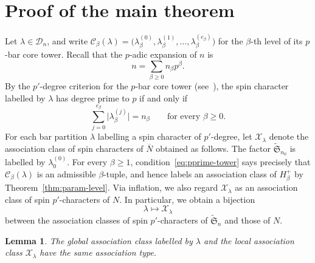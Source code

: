 \documentclass[reqno]{amsart}
\newcommand{\sym}{\mathfrak{S}}
\newtheorem{lemma}[theorem]{Lemma}     %
\theoremstyle{definition}
\begin{document}
\section{Proof of the main theorem}
\label{sec:main-proof}

Let $\lambda\in\mathcal D_n$, and write
$
\mathcal C_\beta(\lambda)
=
\bigl(
\lambda_\beta^{(0)},\lambda_\beta^{(1)},\ldots,
\lambda_\beta^{(e_\beta)}
\bigr)
$ 
for the $\beta$-th level of its $p$-bar core tower. Recall that
the $p$-adic expansion of $n$ is
\[
n=\sum_{\beta\geq0}n_\beta p^\beta.
\]
By the $p'$-degree criterion for the $p$-bar core tower
(see~\cite[Proposition~7.3]{olsson}), the spin character labelled by
$\lambda$ has degree prime to $p$ if and only if
\begin{equation}
\label{eq:pprime-tower}
\sum_{j=0}^{e_\beta}
\bigl|\lambda_\beta^{(j)}\bigr|
=
n_\beta
\qquad
\text{for every }\beta\geq0.
\end{equation}
For each bar partition $\lambda$ labelling a spin character of
$p'$-degree, let $\mathcal X_\lambda$ denote the association class of
spin characters of $\overline N$
obtained as follows. The factor $\widetilde{\sym}_{n_0}$ is labelled by
$\lambda_0^{(0)}$. For every $\beta\geq1$,
condition~\eqref{eq:pprime-tower} says precisely that
$\mathcal C_\beta(\lambda)$ is an admissible $\beta$-tuple, and hence
labels an association class of $H_\beta^+$ by
Theorem~\ref{thm:param-level}.
Via inflation, we also regard $\mathcal X_\lambda$ as an association class
of spin $p'$-characters of $N$. In particular, we obtain a bijection
\begin{equation}
\label{eq:bijass}
\lambda\longmapsto\mathcal X_\lambda
\end{equation}
between the association classes of spin $p'$-characters of
$\widetilde{\sym}_n$ and those of $N$.

\begin{lemma}
\label{lem:global-local-association}
The global association class labelled by $\lambda$ and the local
association class $\mathcal X_\lambda$ have the same association type.
\end{lemma}
\end{document}

